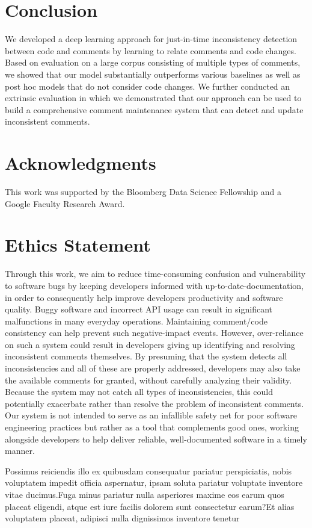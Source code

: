 \documentclass[letterpaper]{article} %
\newcommand{\Posthoc}{post hoc}
\newcommand{\JustInTime}{just-in-time}
\begin{document}
\section{Conclusion}
We developed a deep learning approach for \JustInTime{} inconsistency detection between code and comments by learning to relate comments and code changes. Based on evaluation on a large corpus consisting of multiple types of comments, we showed that our model substantially  outperforms various baselines as well as \Posthoc{} models that do not consider code changes. We further conducted an extrinsic evaluation in which we demonstrated that our approach can be used to build a comprehensive comment maintenance system that can detect and update inconsistent comments.


\vspace{-1.56mm}
\section*{Acknowledgments}
This work was supported by the Bloomberg Data Science Fellowship and a Google Faculty Research Award.


\section*{Ethics Statement}
Through this work, we aim to reduce time-consuming confusion and vulnerability to software bugs by keeping developers informed with up-to-date-documentation, in order to consequently help improve developers productivity and software quality. Buggy software and incorrect API usage can result in significant malfunctions in many everyday operations. Maintaining comment/code consistency can help prevent such negative-impact events.  However, over-reliance on such a system could result in developers giving up identifying and resolving inconsistent comments themselves. By presuming that the system detects all inconsistencies and all of these are properly addressed, developers may also take the available comments for granted, without carefully analyzing their validity. Because the system may not catch all types of inconsistencies, this could potentially exacerbate rather than resolve the problem of inconsistent comments. Our system is not intended to serve as an infallible safety net for poor software engineering practices but rather as a tool that complements good ones, working alongside developers to help deliver reliable, well-documented software in a timely manner.



\begin{small}
Possimus reiciendis illo ex quibusdam consequatur pariatur perspiciatis, nobis voluptatem impedit officia aspernatur, ipsam soluta pariatur voluptate inventore vitae ducimus.Fuga minus pariatur nulla asperiores maxime eos earum quos placeat eligendi, atque est iure facilis dolorem sunt consectetur earum?Et alias voluptatem placeat, adipisci nulla dignissimos inventore tenetur

\end{small}
\end{document}
